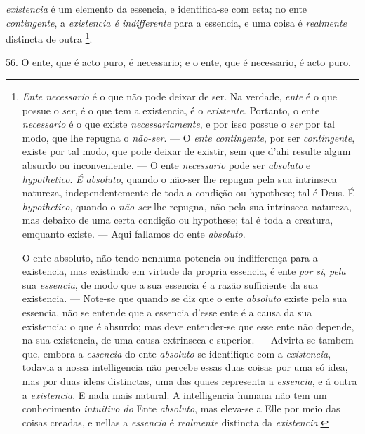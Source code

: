  \emph{existencia} é um elemento da essencia, e identifica-se com esta; no ente \emph{contingente}, a \emph{existencia é indifferente} para a essencia, e uma coisa é \emph{realmente} distincta de outra \footnote{\emph{Ente necessario} é o que não pode deixar de ser. Na verdade, \emph{ente} é o que possue o \emph{ser}, é o que tem a existencia, é o \emph{existente}. Portanto, o ente \emph{necessario} é o que existe \emph{necessariamente}, e por isso possue o \emph{ser} por tal modo, que lhe repugna o \emph{não-ser}. --- O \emph{ente contingente}, por ser \emph{contingente}, existe por tal modo, que pode deixar de existir, sem que d'ahi resulte algum absurdo ou inconveniente. --- O ente \emph{necessario} pode ser \emph{absoluto} e \emph{hypothetico}. \emph{É absoluto}, quando o não-ser lhe repugna pela sua intrinseca natureza, independentemente de toda a condição ou hypothese; tal é Deus. É \emph{hypothetico}, quando o \emph{não-ser} lhe repugna, não pela sua intrinseca natureza, mas debaixo de uma certa condição ou hypothese; tal é toda a creatura, emquanto existe. --- Aqui fallamos do ente \emph{absoluto}.\par O ente absoluto, não tendo nenhuma potencia ou indifferença para a existencia, mas existindo em virtude da propria essencia, é ente \emph{por si}, \emph{pela} sua \emph{essencia}, de modo que a sua essencia é a razão sufficiente da sua existencia. --- Note-se que quando se diz que o ente \emph{absoluto} existe pela sua essencia, não se entende que a essencia d'esse ente é a causa da sua existencia: o que é absurdo; mas deve entender-se que esse ente não depende, na sua existencia, de uma causa extrinseca e superior. --- Advirta-se tambem que, embora a \emph{essencia} do ente \emph{absoluto} se identifique com a \emph{existencia}, todavia a nossa intelligencia não percebe essas duas coisas por uma só idea, mas por duas ideas distinctas, uma das quaes representa a \emph{essencia}, e á outra a \emph{existencia}. E nada mais natural. A intelligencia humana não tem um conhecimento \emph{intuitivo do} Ente \emph{absoluto}, mas eleva-se a Elle por meio das coisas creadas, e nellas a \emph{essencia} é \emph{realmente} distincta da \emph{existencia}.}.

 56. O ente, que é acto puro, é necessario; e o ente, que é necessario, é acto puro.

